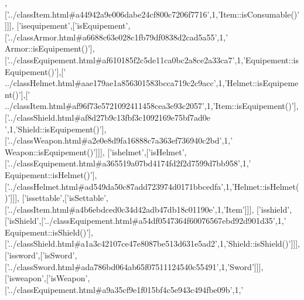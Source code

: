 \begin{DoxyCode}
  [\textcolor{stringliteral}{'isconsumable'},[\textcolor{stringliteral}{'isConsumable'},[\textcolor{stringliteral}{'../classConsumable.html#a1507e9df06233734baccbd50bc9ca3ed'},1,\textcolor{stringliteral}{'
      Consumable::isConsumable()'}],[\textcolor{stringliteral}{'../classItem.html#a44942a9e006dabe24cf800c7206f7716'},1,\textcolor{stringliteral}{'Item::isConsumable()'}]]],
  [\textcolor{stringliteral}{'isequipement'},[\textcolor{stringliteral}{'isEquipement'},[\textcolor{stringliteral}{'../classArmor.html#a6688c63e028c1fb79df0838d2cad5a55'},1,\textcolor{stringliteral}{'
      Armor::isEquipement()'}],[\textcolor{stringliteral}{'../classEquipement.html#af610185f2c5de11ca0bc2a8ce2a33ca7'},1,\textcolor{stringliteral}{'Equipement::isEquipement()'}],[\textcolor{stringliteral}{'
      ../classHelmet.html#aae179ae1a856301583bcca719c2c9acc'},1,\textcolor{stringliteral}{'Helmet::isEquipement()'}],[\textcolor{stringliteral}{'
      ../classItem.html#af96f73e5721092411458cea3e93c2057'},1,\textcolor{stringliteral}{'Item::isEquipement()'}],[\textcolor{stringliteral}{'../classShield.html#af8d27b9c13fbf3c1092169e75bf7ad0e
      '},1,\textcolor{stringliteral}{'Shield::isEquipement()'}],[\textcolor{stringliteral}{'../classWeapon.html#a2e0e8d9fa16888c7a363ef736940c2bd'},1,\textcolor{stringliteral}{'
      Weapon::isEquipement()'}]]],
  [\textcolor{stringliteral}{'ishelmet'},[\textcolor{stringliteral}{'isHelmet'},[\textcolor{stringliteral}{'../classEquipement.html#a365519a07bd4174fd2f2d7599d7bb958'},1,\textcolor{stringliteral}{'
      Equipement::isHelmet()'}],[\textcolor{stringliteral}{'../classHelmet.html#ad549da50c87add723974d0171bbcedfa'},1,\textcolor{stringliteral}{'Helmet::isHelmet()'}]]],
  [\textcolor{stringliteral}{'issettable'},[\textcolor{stringliteral}{'isSettable'},[\textcolor{stringliteral}{'../classItem.html#a4b6ebdced0c34d42adb47db18c01190e'},1,\textcolor{stringliteral}{'Item'}]]],
  [\textcolor{stringliteral}{'isshield'},[\textcolor{stringliteral}{'isShield'},[\textcolor{stringliteral}{'../classEquipement.html#a54df0547364f60076567ebd92d901d35'},1,\textcolor{stringliteral}{'
      Equipement::isShield()'}],[\textcolor{stringliteral}{'../classShield.html#a1a3c42107ce47e8087be513d631e5ad2'},1,\textcolor{stringliteral}{'Shield::isShield()'}]]],
  [\textcolor{stringliteral}{'issword'},[\textcolor{stringliteral}{'isSword'},[\textcolor{stringliteral}{'../classSword.html#ada786bd064ab65f07511124540c55491'},1,\textcolor{stringliteral}{'Sword'}]]],
  [\textcolor{stringliteral}{'isweapon'},[\textcolor{stringliteral}{'isWeapon'},[\textcolor{stringliteral}{'../classEquipement.html#a9a35cf9e1f015bf4c5e943c494fbe09b'},1,\textcolor{stringliteral}{'
}
\end{DoxyCode}
